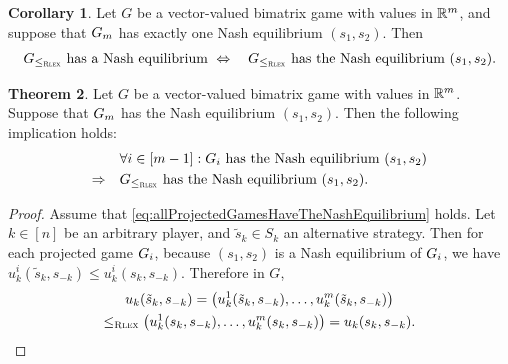 \documentclass[a4paper,DIV=11,abstracton,twoside=semi]{scrreprt}
\theoremstyle{definition}
\newtheorem{thm}{Theorem}[chapter] %
\newtheorem{cor}[thm]{Corollary}
\begin{document}
    \begin{cor}
        Let $G$ be a vector-valued bimatrix game with values in $\mathbb{R}^m$, and suppose that  $G_{m}$ has exactly one Nash equilibrium $(s_1, s_2)$.
        Then
        \begin{gather*}
            G_{\leq_{\textsc{Rlex}}} \text{ has a Nash equilibrium } 
            \Leftrightarrow\quad G_{\leq_{\textsc{Rlex}}} \text{ has the Nash equilibrium } (s_1, s_2).   
        \end{gather*}
    \end{cor}

    \begin{thm}
        \label{thm:rlexGameProjectedGameSufficientCondition}
        Let $G$ be a vector-valued bimatrix game with values in $\mathbb{R}^m$.
        Suppose that $G_{m}$ has the 
        Nash equilibrium $(s_1, s_2)$.    
        Then the following implication holds:
        \begin{align}
            \label{eq:allProjectedGamesHaveTheNashEquilibrium}
                            &\forall i \in [m-1]: G_{i} \text{ has the Nash equilibrium } (s_1, s_2) \\
            \Rightarrow\quad &G_{\leq_{\textsc{Rlex}}} \text{ has the Nash equilibrium } (s_1, s_2).
        \end{align}
    \end{thm}
    \begin{proof}
        Assume that \eqref{eq:allProjectedGamesHaveTheNashEquilibrium} holds.
        Let $k \in [n]$ be an arbitrary player, and $\tilde{s}_k \in S_k$ an alternative strategy.
        Then for each projected game $G_{i}$, because $(s_1, s_2)$ is a Nash equilibrium of $G_{i}$, we have $u_k^{i}(\tilde{s}_k, s_{-k}) \leq u_k^{i}(s_k, s_{-k})$.
        Therefore in $G$,
        \begin{multline*}
            u_k(\tilde{s}_k, s_{-k}) 
            = \bigl(u_k^{1}(\tilde{s}_k, s_{-k}), \dots, u_k^{m}(\tilde{s}_k, s_{-k})\bigr) \\
            \leq_{\textsc{Rlex}} \bigl(u_k^{1}(s_k, s_{-k}), \dots, u_k^{m}(s_k, s_{-k})\bigr)
            = u_k(s_k, s_{-k}).
        \end{multline*}
    \end{proof}
\end{document}
